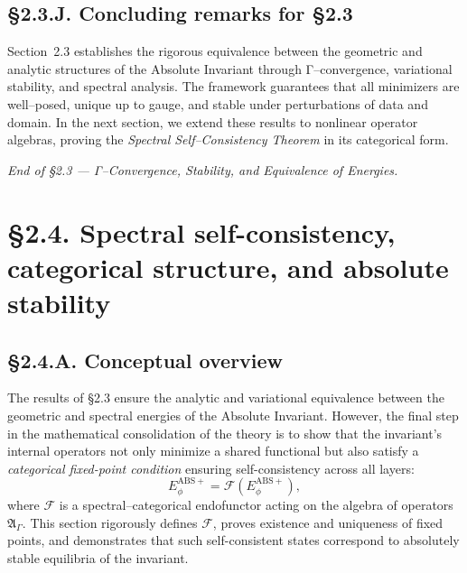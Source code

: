 \subsection*{§2.3.J. Concluding remarks for §2.3}

Section~2.3 establishes the rigorous equivalence between the geometric and analytic structures of the Absolute Invariant through Γ–convergence, variational stability, and spectral analysis.
The framework guarantees that all minimizers are well–posed, unique up to gauge, and stable under perturbations of data and domain.
In the next section, we extend these results to nonlinear operator algebras, proving the \emph{Spectral Self–Consistency Theorem} in its categorical form.

\begin{center}
\textit{End of §2.3 — Γ–Convergence, Stability, and Equivalence of Energies.}
\end{center}


\section{§2.4. Spectral self-consistency, categorical structure, and absolute stability}
\label{sec:2.4-selfconsistency}

\subsection*{§2.4.A. Conceptual overview}

The results of §2.3 ensure the analytic and variational equivalence between the geometric and spectral energies of the Absolute Invariant.
However, the final step in the mathematical consolidation of the theory is to show that the invariant’s internal operators not only minimize a shared functional but also satisfy a \emph{categorical fixed-point condition} ensuring self-consistency across all layers:
\[
E_\phi^{\mathrm{ABS+}} = \mathcal{F}(E_\phi^{\mathrm{ABS+}}),
\]
where $\mathcal{F}$ is a spectral–categorical endofunctor acting on the algebra of operators $\mathfrak{A}_\Gamma$.
This section rigorously defines $\mathcal{F}$, proves existence and uniqueness of fixed points, and demonstrates that such self-consistent states correspond to absolutely stable equilibria of the invariant.

